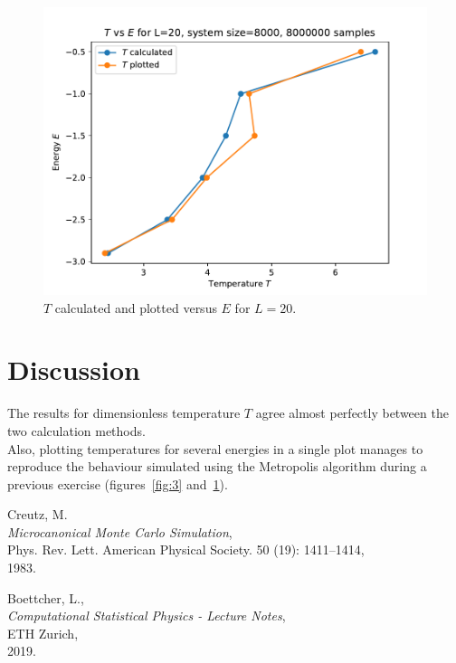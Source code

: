 \documentclass[11pt,a4paper]{article}
\begin{document}
\begin{figure}
	\includegraphics{T_vs_E_L20.pdf}
	\caption{$T$ calculated and plotted versus $E$ for $L=20$.}
	\label{fig:4}
	\end{figure}
	




\section{Discussion}
The results for dimensionless temperature $T$ agree almost perfectly between the two calculation methods.\\
Also, plotting temperatures for several energies in a single plot manages to reproduce the behaviour simulated using the 
Metropolis algorithm during a previous exercise (figures~\ref{fig:3} and~\ref{fig:4}).


\pagebreak
\begin{thebibliography}{99}

	Creutz, M.\\
	\emph{Microcanonical Monte Carlo Simulation},\\
	Phys. Rev. Lett. American Physical Society. 50 (19): 1411–1414,\\
	1983.


	Boettcher, L.,\\
	\emph{Computational Statistical Physics - Lecture Notes},\\
	ETH Zurich,\\
	2019.

\end{thebibliography}
\end{document}
